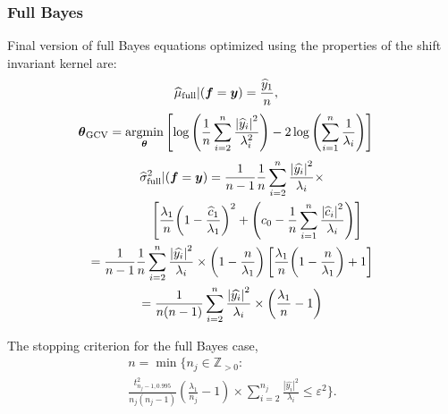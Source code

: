 \documentclass[twocolumn]{svjour3}          %
\newcommand{\bm}[1]{\boldsymbol{#1}}
\newcommand{\posIntegers}{\mathbb{Z}_{> 0}}
\newcommand{\vtheta}{{\bm{\theta}}}
\newcommand{\vf}{\bm{f}}
\newcommand{\vy}{\bm{y}}
\def\abs#1{\ensuremath{\left \lvert #1 \right \rvert}}
\providecommand{\argmin}{\operatorname*{argmin}}
\begin{document}
\subsubsection{Full Bayes}
Final version of full Bayes equations optimized using the properties of the shift invariant kernel are:
\begin{align}
\label{FJH:eq:cubFull}
\widehat{\mu}_{\textup{full}}  \vert ( \vf = \vy) &= 
 \frac{\widehat{y}_1}{n} ,
\end{align}
\begin{align}
\vtheta_{\textup{GCV}} 
&= \argmin_\vtheta \left[ \log \left ( \frac 1n \sum_{i=2}^n \frac{\abs{\widehat{y}_i}^2}{\lambda_i^2} 
\right) -2\log\left( \sum_{i=1}^n \frac{1}{\lambda_i} \right)
\right]
\end{align}
\begin{multline*}
\widehat{\sigma}^2_{\textup{full}}  \vert ( \vf = \vy) 
= 
\frac{1}{n-1} 
\frac{1}{n} \sum_{i=2}^n \frac{\abs{\widehat{y_i}}^2}{\lambda_i} \times
\\
\qquad \qquad \left[\frac{\lambda_1}{n}{\left(1 - \frac{\widehat{c}_1}{\lambda_1}\right)^2} + \left(c_0  - \frac 1n \sum_{i=1}^n \frac{\abs{\widehat{c}_i}^2}{\lambda_i}\right) \right] 
\\
= 
\frac{1}{n-1} 
\frac{1}{n} \sum_{i=2}^n \frac{\abs{\widehat{y_i}}^2}{\lambda_i} 
\times
\left( 1- \frac{n}{\lambda_1}\right) \left[\frac{\lambda_1}{n}{\left(1 - \frac{n}{\lambda_1}\right)} + 1\right] 
\\
= 
\frac{1}{n(n-1)} \sum_{i=2}^n \frac{\abs{\widehat{y_i}}^2}{\lambda_i}
\times
\left( \frac{\lambda_1}{n} - 1\right)  
\end{multline*}

The stopping criterion for the full Bayes case,  
\begin{multline} \label{FJH:eq:stopcritHyper}
n  = \min \biggl \{n_j \in \posIntegers:  
\\
\frac {t_{n_j-1,0.995}^2}{n_j(n_j - 1)} 
\left( \frac{\lambda_1}{n_j} - 1\right)  
\times
 \sum_{i=2}^{n_j} \frac{\abs{\widehat{y_i}}^2}{\lambda_i}  \le \varepsilon^2 \biggr\}.
\end{multline}
\end{document}
